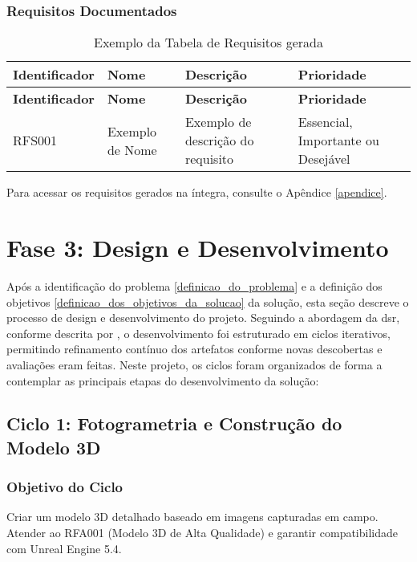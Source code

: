 \subsubsection{Requisitos Documentados}
\label{sec:requisitos_documentados}
{\small 
\begin{longtable}{|p{2.5cm}|p{4cm}|p{6cm}|p{2cm}|}
\caption{Exemplo da Tabela de Requisitos gerada}
\label{table:exemplo_tabela_requisitos} \\
\hline
\textbf{Identificador} & \textbf{Nome} & \textbf{Descrição} & \textbf{Prioridade} \\
\hline
\endfirsthead
\hline
\textbf{Identificador} & \textbf{Nome} & \textbf{Descrição} & \textbf{Prioridade} \\
\hline
\endhead
RFS001 & Exemplo de Nome & Exemplo de descrição do requisito & Essencial, Importante ou Desejável \\ \hline
\end{longtable}
}
Para acessar os requisitos gerados na íntegra, consulte o Apêndice \ref{apendice}.


\section{Fase 3: Design e Desenvolvimento}\label{sec: Fase 3 design e desenvolvimento}
Após a identificação do problema \ref{definicao_do_problema} e a definição dos objetivos \ref{definicao_dos_objetivos_da_solucao} da solução, esta seção descreve o processo de design e desenvolvimento do projeto. Seguindo a abordagem da \gls{dsr}, conforme descrita por \cite{peffers2007design}, o desenvolvimento foi estruturado em ciclos iterativos, permitindo refinamento contínuo dos artefatos conforme novas descobertas e avaliações eram feitas.
Neste projeto, os ciclos foram organizados de forma a contemplar as principais etapas do desenvolvimento da solução:

\subsection*{Ciclo 1: Fotogrametria e Construção do Modelo 3D} \label{subsec:ciclo1}

\subsubsection*{Objetivo do Ciclo}
Criar um modelo 3D detalhado baseado em imagens capturadas em campo. Atender ao RFA001 (Modelo 3D de Alta Qualidade) e garantir compatibilidade com Unreal Engine 5.4. 

